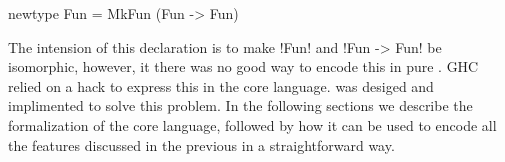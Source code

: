 \documentclass[manuscript,screen,nonacm]{acmart}
\begin{document}
\begin{CenteredBox}
\begin{code}
newtype Fun = MkFun (Fun -> Fun)
\end{code}
\end{CenteredBox}
The intension of this declaration is to make !Fun! and !Fun -> Fun! be isomorphic, however, it there was no good way to encode this in pure \SF. GHC relied on a hack to express this in the core language.
\SFC\cite{sulzmann_system_2007} was desiged and implimented to solve this problem. In the following sections we describe the formalization of the core language, followed by how it can be used to encode all the features discussed in the previous  in a straightforward way.







\end{document}
